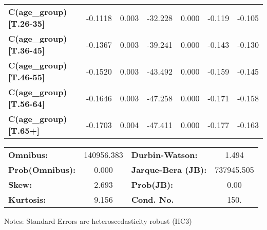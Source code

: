 \begin{center}
\begin{tabular}{lcccccc}
\textbf{C(age\_group)[T.26-35]}                                                   &      -0.1118  &        0.003     &   -32.228  &         0.000        &       -0.119    &       -0.105     \\
\textbf{C(age\_group)[T.36-45]}                                                   &      -0.1367  &        0.003     &   -39.241  &         0.000        &       -0.143    &       -0.130     \\
\textbf{C(age\_group)[T.46-55]}                                                   &      -0.1520  &        0.003     &   -43.492  &         0.000        &       -0.159    &       -0.145     \\
\textbf{C(age\_group)[T.56-64]}                                                   &      -0.1646  &        0.003     &   -47.258  &         0.000        &       -0.171    &       -0.158     \\
\textbf{C(age\_group)[T.65+]}                                                     &      -0.1703  &        0.004     &   -47.411  &         0.000        &       -0.177    &       -0.163     \\
\bottomrule
\end{tabular}
\begin{tabular}{lclc}
\textbf{Omnibus:}       & 140956.383 & \textbf{  Durbin-Watson:     } &     1.494   \\
\textbf{Prob(Omnibus):} &    0.000   & \textbf{  Jarque-Bera (JB):  } & 737945.505  \\
\textbf{Skew:}          &    2.693   & \textbf{  Prob(JB):          } &      0.00   \\
\textbf{Kurtosis:}      &    9.156   & \textbf{  Cond. No.          } &      150.   \\
\bottomrule
\end{tabular}
\end{center}

Notes: \newline
 [1] Standard Errors are heteroscedasticity robust (HC3)